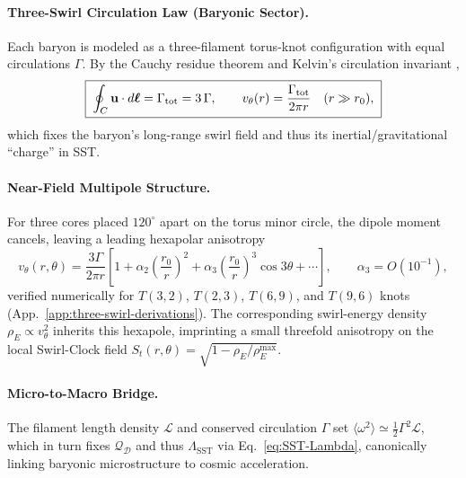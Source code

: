 \documentclass[reprint,aps,onecolumn,nofootinbib]{revtex4-2}
\begin{document}
    \paragraph{Three-Swirl Circulation Law (Baryonic Sector).}
        Each baryon is modeled as a three-filament torus-knot configuration with
        equal circulations $\Gamma$. By the Cauchy residue theorem and Kelvin’s circulation
        invariant \cite{Kelvin1869,Batchelor1967,Saffman1992},
        \begin{equation}
        \boxed{\;
        \oint_{C} \mathbf{u}\cdot d\boldsymbol{\ell} =
            \Gamma_{\rm tot} = 3\,\Gamma,
            \qquad
            v_\theta(r)=\frac{\Gamma_{\rm tot}}{2\pi r}\quad(r\gg r_0),
            \;}
        \label{eq:three-swirl-circulation}
        \end{equation}
        which fixes the baryon’s long-range swirl field and thus its inertial/gravitational
        ``charge'' in SST.

    \paragraph{Near-Field Multipole Structure.}
        For three cores placed $120^\circ$ apart on the torus minor circle, the dipole
        moment cancels, leaving a leading hexapolar anisotropy
        \begin{equation}
        \boxed{\;
        v_\theta(r,\theta)=\frac{3\Gamma}{2\pi r}\!\left[
                                                       1+\alpha_2\!\left(\frac{r_0}{r}\right)^{2}
                                                       +\alpha_3\!\left(\frac{r_0}{r}\right)^{3}\cos 3\theta+\cdots
        \right],
            \qquad
            \alpha_3=O(10^{-1}),
            \;}
        \label{eq:hexapole-expansion}
        \end{equation}
        verified numerically for $T(3,2)$, $T(2,3)$, $T(6,9)$, and $T(9,6)$ knots
        (App.~\ref{app:three-swirl-derivations}).
        The corresponding swirl-energy density $\rho_{\!E}\propto v_\theta^2$ inherits this
        hexapole, imprinting a small threefold anisotropy on the local Swirl-Clock field
        $S_t(r,\theta)=\sqrt{1-\rho_{\!E}/\rho_{\!E}^{\max}}$.

    \paragraph{Micro-to-Macro Bridge.}
        The filament length density $\mathcal{L}$ and conserved circulation $\Gamma$
        set $\langle\omega^2\rangle\simeq \tfrac12\Gamma^2\mathcal{L}$, which in turn fixes
        $\mathcal{Q}_\mathcal{D}$ and thus $\Lambda_{\!\mathrm{SST}}$ via
        Eq.~\eqref{eq:SST-Lambda}, canonically linking baryonic microstructure to cosmic
        acceleration.
\end{document}
